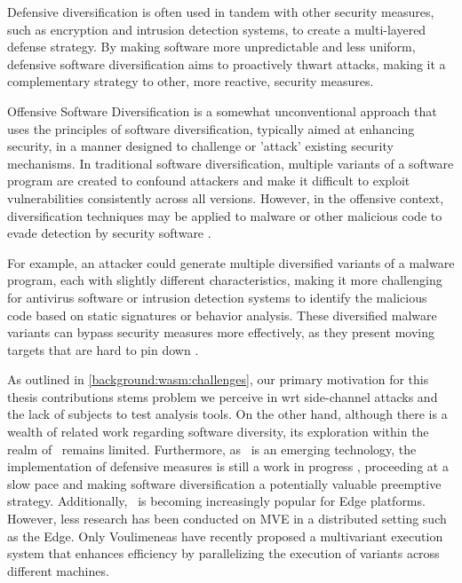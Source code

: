 Defensive diversification is often used in tandem with other security measures, such as encryption and intrusion detection systems, to create a multi-layered defense strategy. 
By making software more unpredictable and less uniform, defensive software diversification aims to proactively thwart attacks, making it a complementary strategy to other, more reactive, security measures.


Offensive Software Diversification is a somewhat unconventional approach that uses the principles of software diversification, typically aimed at enhancing security, in a manner designed to challenge or 'attack' existing security mechanisms. 
In traditional software diversification, multiple variants of a software program are created to confound attackers and make it difficult to exploit vulnerabilities consistently across all versions. 
However, in the offensive context, diversification techniques may be applied to malware or other malicious code to evade detection by security software \cite{wobfuscator}.

For example, an attacker could generate multiple diversified variants of a malware program, each with slightly different characteristics, making it more challenging for antivirus software or intrusion detection systems to identify the malicious code based on static signatures or behavior analysis. 
These diversified malware variants can bypass security measures more effectively, as they present moving targets that are hard to pin down \cite{MTDNationalCyberLaep}.


\label{sota:openchallenges}

As outlined in \autoref{background:wasm:challenges}, our primary motivation for this thesis contributions stems problem we perceive in \wasm wrt side-channel attacks and the lack of \wasm subjects to test analysis tools.
On the other hand, although there is a wealth of related work regarding software diversity, its exploration within the realm of \wasm\ remains limited. 
Furthermore, as \wasm\ is an emerging technology, the implementation of defensive measures is still a work in progress \cite{Narayan2021Swivel, johnson2021}, proceeding at a slow pace and making software diversification a potentially valuable preemptive strategy. 
Additionally, \wasm\ is becoming increasingly popular for Edge platforms. 
However, less research has been conducted on MVE in a distributed setting such as the Edge. Only Voulimeneas \etal \cite{voulimeneas2021dmvx} have recently proposed a multivariant execution system that enhances efficiency by parallelizing the execution of variants across different machines.



